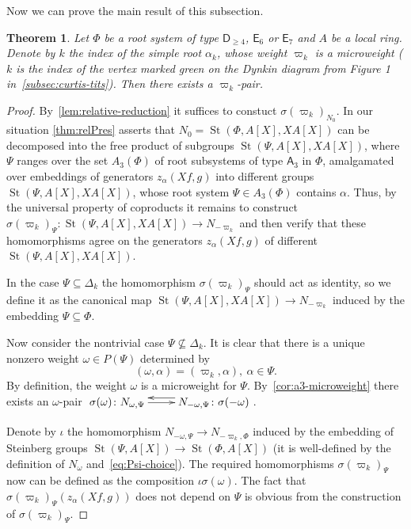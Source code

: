 \documentclass[oneside, 10pt]{amsart}
\DeclareMathOperator{\St}{St}
\newcommand{\rA}{\mathsf{A}}
\newcommand{\rD}{\mathsf{D}}
\newcommand{\rE}{\mathsf{E}}
\newtheorem{thm}{Theorem}
\numberwithin{equation}{section}
\numberwithin{thm}{section}
\numberwithin{lemma}{section}
\theoremstyle{definition}
\theoremstyle{remark}
\begin{document}
Now we can prove the main result of this subsection.
\begin{thm} \label{thm:pairconstr}
Let $\Phi$ be a root system of type $\rD_{\geq 4}$, $\rE_6$ or $\rE_7$ and $A$ be a local ring.
Denote by $k$ the index of the simple root $\alpha_k$, whose weight $\varpi_k$ is a microweight
($k$ is the index of the vertex marked green on the Dynkin diagram from Figure 1 in~\cref{subsec:curtis-tits}).
Then there exists a $\varpi_k$-pair.
\end{thm}
\begin{proof}
By~\cref{lem:relative-reduction} it suffices to constuct $\sigma({\varpi_k})_{N_0}$.
In our situation \cref{thm:relPres} asserts that $N_0 = \St(\Phi, A[X], XA[X])$ can be decomposed into the free product of subgroups $\St(\Psi, A[X], XA[X])$,
where $\Psi$ ranges over the set $A_3(\Phi)$ of root subsystems of type $\rA_3$ in $\Phi$, amalgamated over embeddings of generators $z_\alpha(Xf, g)$ into different groups $\St(\Psi, A[X], XA[X])$, whose root system $\Psi \in A_3(\Phi)$ contains $\alpha$.
Thus, by the universal property of coproducts it remains to construct $\sigma(\varpi_k)_\Psi \colon \St(\Psi, A[X], XA[X]) \to N_{-\varpi_k}$ and then
verify that these homomorphisms agree on the generators $z_\alpha(Xf, g)$ of different $\St(\Psi, A[X], XA[X])$.

In the case $\Psi \subseteq \Delta_k$ the homomorphism $\sigma(\varpi_k)_\Psi$ should act as identity, so we define it as the canonical map $\St(\Psi, A[X], XA[X]) \to N_{-\varpi_k}$
induced by the embedding $\Psi \subseteq \Phi$.

Now consider the nontrivial case $\Psi \not\subseteq \Delta_k$.
It is clear that there is a unique nonzero weight $\omega \in P(\Psi)$ determined by
\begin{equation} \label{eq:Psi-choice} (\omega, \alpha) = (\varpi_k, \alpha),\ \alpha \in \Psi. \end{equation}
By definition, the weight $\omega$ is a microweight for $\Psi$.
By~\cref{cor:a3-microweight} there exists an $\omega$-pair $\xymatrix{ \sigma(\omega)\colon N_{\omega, \Psi} \ar[r] & \ar@<-1.0ex>[l] N_{-\omega, \Psi}\colon \sigma(-\omega) }$.

Denote by $\iota$ the homomorphism $N_{-\omega, \Psi} \to N_{-\varpi_k, \Phi}$ induced by the embedding of Steinberg groups $\St(\Psi, A[X]) \to \St(\Phi, A[X])$ (it is well-defined by the definition of $N_\omega$ and~\eqref{eq:Psi-choice}).
The required homomorphisms $\sigma(\varpi_k)_\Psi$ now can be defined as the composition $\iota \sigma(\omega)$.
The fact that $\sigma(\varpi_k)_\Psi(z_\alpha(Xf, g))$ does not depend on $\Psi$ is obvious from the construction of $\sigma(\varpi_k)_\Psi$.
\end{proof}
\end{document}
